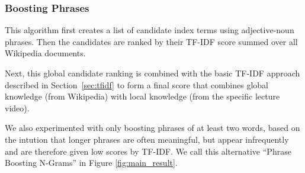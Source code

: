 \subsubsection{Boosting Phrases}

This algorithm first creates a list of candidate index terms using
adjective-noun phrases. Then the candidates are ranked by their TF-IDF score
summed over all Wikipedia documents.

Next, this global candidate ranking is combined with the basic TF-IDF approach
described in Section~\ref{sec:tfidf} to form a final score that combines global
knowledge (from Wikipedia) with local knowledge (from the specific lecture video). 
%

We also experimented with only boosting phrases of at least two words,
based on the intution that longer phrases are often meaningful, but
appear infrequently and are therefore given low scores by TF-IDF. We
call this alternative ``Phrase Boosting N-Grams'' in Figure
\ref{fig:main_result}.
%
%
%

